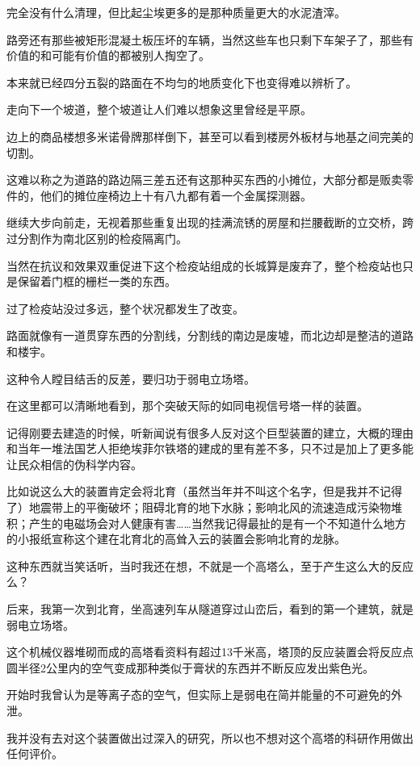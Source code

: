 完全没有什么清理，但比起尘埃更多的是那种质量更大的水泥渣滓。

路旁还有那些被矩形混凝土板压坏的车辆，当然这些车也只剩下车架子了，那些有价值的和可能有价值的都被别人掏空了。

本来就已经四分五裂的路面在不均匀的地质变化下也变得难以辨析了。

走向下一个坡道，整个坡道让人们难以想象这里曾经是平原。

边上的商品楼想多米诺骨牌那样倒下，甚至可以看到楼房外板材与地基之间完美的切割。

这难以称之为道路的路边隔三差五还有这那种买东西的小摊位，大部分都是贩卖零件的，他们的摊位座椅边上十有八九都有着一个金属探测器。

继续大步向前走，无视着那些重复出现的挂满流锈的房屋和拦腰截断的立交桥，跨过分割作为南北区别的检疫隔离门。

当然在抗议和效果双重促进下这个检疫站组成的长城算是废弃了，整个检疫站也只是保留着门框的栅栏一类的东西。

过了检疫站没过多远，整个状况都发生了改变。

路面就像有一道贯穿东西的分割线，分割线的南边是废墟，而北边却是整洁的道路和楼宇。

这种令人瞠目结舌的反差，要归功于弱电立场塔。

在这里都可以清晰地看到，那个突破天际的如同电视信号塔一样的装置。

记得刚要去建造的时候，听新闻说有很多人反对这个巨型装置的建立，大概的理由和当年一堆法国艺人拒绝埃菲尔铁塔的建成的里有差不多，只不过是加上了更多能让民众相信的伪科学内容。

比如说这么大的装置肯定会将北育（虽然当年并不叫这个名字，但是我并不记得了）地震带上的平衡破坏；阻碍北育的地下水脉；影响北风的流速造成污染物堆积；产生的电磁场会对人健康有害……当然我记得最扯的是有一个不知道什么地方的小报纸宣称这个建在北育北的高耸入云的装置会影响北育的龙脉。

这种东西就当笑话听，当时我还在想，不就是一个高塔么，至于产生这么大的反应么？

后来，我第一次到北育，坐高速列车从隧道穿过山峦后，看到的第一个建筑，就是弱电立场塔。

这个机械仪器堆砌而成的高塔看资料有超过13千米高，塔顶的反应装置会将反应点圆半径2公里内的空气变成那种类似于膏状的东西并不断反应发出紫色光。

开始时我曾认为是等离子态的空气，但实际上是弱电在简并能量的不可避免的外泄。

我并没有去对这个装置做出过深入的研究，所以也不想对这个高塔的科研作用做出任何评价。

